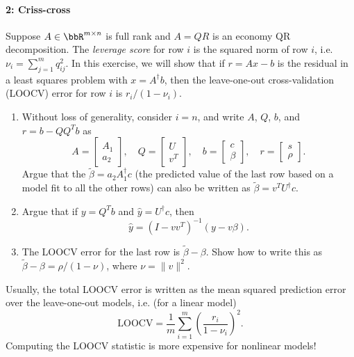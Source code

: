 \documentclass[12pt, leqno]{article} %
\begin{document}
\paragraph*{2: Criss-cross}
Suppose $A \in \bbR^{m \times n}$ is full rank and $A = QR$ is an
economy QR decomposition.  The {\em leverage score} for
row $i$ is the squared norm of row $i$,
i.e.~$\nu_i = \sum_{j=1}^m q_{ij}^2$.  In this exercise, we will show
that if $r = Ax-b$ is the residual in a least squares problem with
$x = A^\dagger b$, then the leave-one-out cross-validation (LOOCV) error
for row $i$ is $r_i/(1-\nu_i)$.
\begin{enumerate}
\item Without loss of generality, consider $i = n$, and write
  $A$, $Q$, $b$, and $r = b-QQ^T b$ as
  \[
    A = \begin{bmatrix} A_1 \\ a_2 \end{bmatrix}, \quad
    Q = \begin{bmatrix} U \\ v^T \end{bmatrix}, \quad
    b = \begin{bmatrix} c \\ \beta \end{bmatrix}, \quad
    r = \begin{bmatrix} s \\ \rho \end{bmatrix}.
  \]
  Argue that the $\tilde{\beta} = a_2 A_1^\dagger c$
  (the predicted value of the last row based on a model fit to
  all the other rows) can also be written as
  $\tilde{\beta} = v^T U^\dagger c$.
\item Argue that if $y = Q^T b$ and $\hat{y} = U^\dagger c$, then
  \[
    \hat{y} = (I-vv^T)^{-1} (y-v\beta).
  \]
\item The LOOCV error for the last row is $\tilde{\beta} - \beta$.
  Show how to write this as $\tilde{\beta} - \beta = \rho/(1-\nu)$,
  where $\nu = \|v\|^2$.
\end{enumerate}
Usually, the total LOOCV error is written as
the mean squared prediction error over the leave-one-out models, i.e.
(for a linear model)
\[
  \mathrm{LOOCV} =
  \frac{1}{m} \sum_{i=1}^m \left( \frac{r_i}{1-\nu_i} \right)^2.
\]
Computing the LOOCV statistic is more expensive for nonlinear models!
\end{document}
